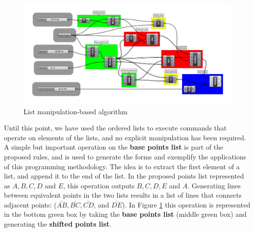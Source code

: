 \documentclass[preprint,12pt,3p]{elsarticle}
\begin{document}
\begin{figure}[!h]
\begin{center}
\includegraphics[width=0.95
\textwidth]{alg02.png}
\caption{List manipulation-based algorithm}
\label{figura:alg02}
\end{center}
\end{figure}

Until this point, we have used the ordered lists to execute commands that operate on elements of the lists, and no explicit manipulation has been required. A simple but important operation on the \textbf{base points list} is part of the proposed rules, and is used to generate the forms and exemplify the applications of this programming methodology. The idea is to extract the first element of a list, and append it to the end of the list. In the proposed points list represented as $A, B, C, D$ and $E$, this operation outputs $B, C, D, E$ and $A$. Generating lines between equivalent points in the two lists results in a list of lines that connects adjacent points: ($\bar{AB}, \bar{BC}, \bar{CD}$, and $\bar{DE}$). In Figure \ref{figura:alg02} this operation is represented in the bottom green box by taking the \textbf{base points list} (middle green box) and generating the \textbf{shifted points list}.
\end{document}
